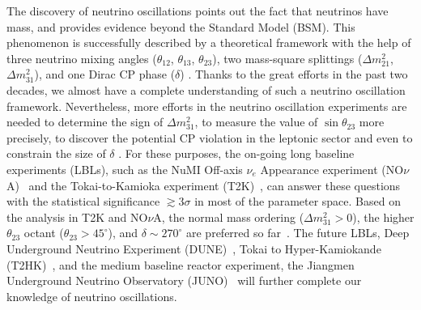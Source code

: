 \documentclass[aps,prd,nofootinbib,preprint]{revtex4}
\begin{document}
The discovery of neutrino oscillations points out the fact that neutrinos have mass, and provides evidence beyond the Standard Model (BSM). This phenomenon is successfully described by a theoretical framework with the help of three neutrino mixing angles ($\theta_{12}$, $\theta_{13}$, $\theta_{23}$), two mass-square splittings ($\Delta m_{21}^2$, $\Delta m_{31}^2$), and one Dirac CP phase ($\delta$) \cite{Pontecorvo:1967fh,Maki:1962mu,Pontecorvo:1957qd,Esteban:2018azc}. Thanks to the great efforts in the past two decades, we almost have a complete understanding of such a neutrino oscillation framework. Nevertheless, more efforts in the neutrino oscillation experiments are needed to determine the sign of $\Delta m_{31}^2$, to measure the value of $\sin\theta_{23}$ more precisely, to discover the potential CP violation in the leptonic sector and even to constrain the size of $\delta$ \cite{Esteban:2018azc}. For these purposes, the on-going long baseline experiments (LBLs), such as the NuMI Off-axis $\nu_e$ Appearance experiment (NO$\nu$A)~\cite{Ayres:2007tu} and the Tokai-to-Kamioka experiment (T2K)~\cite{Abe:2011ks}, can answer these questions with the statistical significance $\gtrsim 3\sigma$ in most of the parameter space. Based on the analysis in T2K and NO$\nu$A, the normal mass ordering ($\Delta m_{31}^2>0$), the higher $\theta_{23}$ octant ($\theta_{23}>45^\circ$), and $\delta\sim270^\circ$ are preferred so far~\cite{Esteban:2018azc}. The future LBLs, Deep Underground Neutrino Experiment (DUNE)~\cite{Acciarri:2015uup}, Tokai to Hyper-Kamiokande (T2HK)~\cite{Abe:2014oxa}, and the medium baseline reactor experiment, the Jiangmen Underground Neutrino Observatory (JUNO)~\cite{Djurcic:2015vqa,An:2015jdp} will further complete our knowledge of neutrino oscillations.
\end{document}
